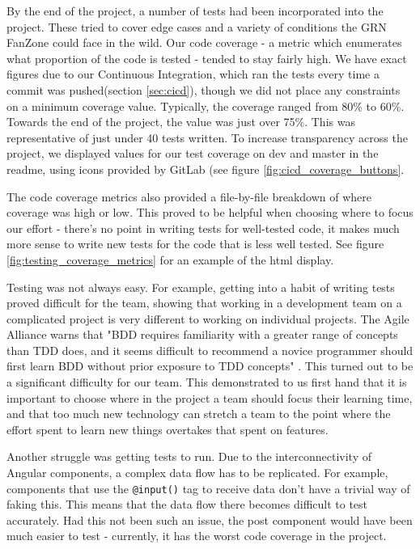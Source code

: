 \documentclass{l3proj}
\begin{document}
By the end of the project, a number of tests had been incorporated into the
 project. These tried to cover edge cases and a variety of conditions the GRN FanZone
 could face in the wild. Our code coverage - a metric which enumerates what
 proportion of the code is tested - tended to stay fairly high. We have exact
 figures due to our Continuous Integration, which ran the tests every time a
 commit was pushed(section \ref{sec:cicd}), though we did not place any constraints
 on a minimum coverage value. Typically, the coverage ranged from 80\% to 60\%.
 Towards the end of the project, the value was just over 75\%. This was
 representative of just under 40 tests written. To increase transparency
 across the project, we displayed values for our test coverage on dev and
 master in the readme, using icons provided by GitLab (see figure
 \ref{fig:cicd_coverage_buttons}.

 The code coverage metrics also provided a file-by-file breakdown of where
 coverage was high or low. This proved to be helpful when choosing
 where to focus our effort - there's no point in writing tests for
 well-tested code, it makes much more sense to write new tests for the
 code that is less well tested. See figure \ref{fig:testing_coverage_metrics}
 for an example of the html display.

Testing was not always easy. For example, getting into a habit of writing tests
 proved difficult for the team, showing that working in a development team on a
 complicated project is very different to working on individual projects. The
 Agile Alliance warns that "BDD requires familiarity with a greater range of
 concepts than TDD does, and it seems difficult to recommend a novice programmer
 should first learn BDD without prior exposure to TDD concepts"
 \cite{agilealliance_bdd}. This turned out to be a significant difficulty for
 our team. This demonstrated to us first hand that it is important to choose where
 in the project a team should focus their learning time, and that too much new technology
 can stretch a team to the point where the effort spent to learn new things
 overtakes that spent on features.

Another struggle was getting tests to run. Due to the interconnectivity of
 Angular components, a complex data flow has to be replicated. For example,
 components that use the \texttt{@input()} tag to receive data don't have a
 trivial way of faking this. This means that the data flow there becomes
 difficult to test accurately. Had this not been such an issue, the post
 component would have been much easier to test - currently, it has the worst
 code coverage in the project.
\end{document}
